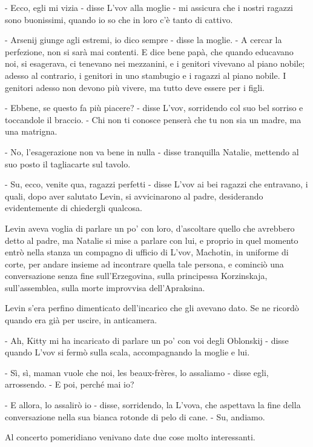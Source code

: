 - Ecco, egli mi vizia - disse L'vov alla moglie - mi assicura che i nostri ragazzi sono buonissimi, quando io so che in loro c'è tanto di cattivo. 

- Arsenij giunge agli estremi, io dico sempre - disse la moglie. - A cercar la perfezione, non si sarà mai contenti. E dice bene papà, che quando educavano noi, si esagerava, ci tenevano nei mezzanini, e i genitori vivevano al piano nobile; adesso al contrario, i genitori in uno stambugio e i ragazzi al piano nobile. I genitori adesso non devono più vivere, ma tutto deve essere per i figli. 

- Ebbene, se questo fa più piacere? - disse L'vov, sorridendo col suo bel sorriso e toccandole il braccio. - Chi non ti conosce penserà che tu non sia un madre, ma una matrigna. 

- No, l'esagerazione non va bene in nulla - disse tranquilla Natalie, mettendo al suo posto il tagliacarte sul tavolo. 

- Su, ecco, venite qua, ragazzi perfetti - disse L'vov ai bei ragazzi che entravano, i quali, dopo aver salutato Levin, si avvicinarono al padre, desiderando evidentemente di chiedergli qualcosa. 

Levin aveva voglia di parlare un po' con loro, d'ascoltare quello che avrebbero detto al padre, ma Natalie si mise a parlare con lui, e proprio in quel momento entrò nella stanza un compagno di ufficio di L'vov, Machotin, in uniforme di corte, per andare insieme ad incontrare quella tale persona, e cominciò una conversazione senza fine sull'Erzegovina, sulla principessa Korzinskaja, sull'assemblea, sulla morte improvvisa dell'Apraksina. 

Levin s'era perfino dimenticato dell'incarico che gli avevano dato. Se ne ricordò quando era già per uscire, in anticamera. 

- Ah, Kitty mi ha incaricato di parlare un po' con voi degli Oblonskij - disse quando L'vov si fermò sulla scala, accompagnando la moglie e lui. 

- Sì, sì, maman vuole che noi, les beaux-frères, lo assaliamo - disse egli, arrossendo. - E poi, perché mai io? 

- E allora, lo assalirò io - disse, sorridendo, la L'vova, che aspettava la fine della conversazione nella sua bianca rotonde di pelo di cane. - Su, andiamo. 

\label{v-6} 

Al concerto pomeridiano venivano date due cose molto interessanti. 


